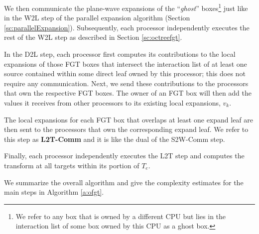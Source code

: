  We then communicate the plane-wave expansions of the ``{\em ghost}'' boxes\footnote{We refer to any box that
 is owned by a different CPU but lies in the interaction list of some box owned by this CPU as a ghost box.} just
 like in the W2L step of the parallel expansion algorithm (Section \ref{sc:parallelExpansion}). Subsequently, each processor 
 independently executes the rest of the W2L step as described in Section \ref{sc:octreefgt}.

In the D2L step, each processor first computes its contributions to the local expansions of those FGT boxes that intersect
 the interaction list of at least one source contained within some direct leaf owned by this processor; this does not 
 require any communication. Next, we send these contributions to the processors that own the respective FGT boxes. The owner of
an FGT box will then add the values it receives from other processors to its existing local expansions, $v_k$.

The local expansions for each FGT box that overlaps at least one expand leaf are then sent to the processors that own
 the corresponding expand leaf. We refer to this step as {\textbf{L2T-Comm}} and it is like the dual of the S2W-Comm step. 
 
Finally, each processor independently executes the L2T step and computes the transform at all targets within its portion of $T_e$.

We summarize the overall algorithm and give the complexity estimates for the main steps in Algorithm \ref{a:ofgt}.  

